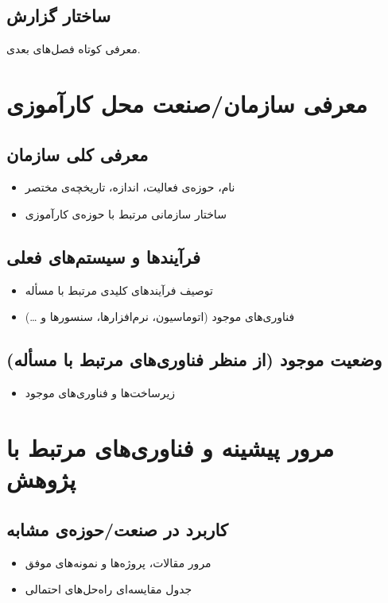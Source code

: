 \documentclass{chamranintern}
\begin{document}
\section{ساختار گزارش}
معرفی کوتاه فصل‌های بعدی.

\chapter{معرفی سازمان/صنعت محل کارآموزی}
\section{معرفی کلی سازمان}
\begin{itemize}
  \item نام، حوزه‌ی فعالیت، اندازه، تاریخچه‌ی مختصر
  \item ساختار سازمانی مرتبط با حوزه‌ی کارآموزی
\end{itemize}

\section{فرآیندها و سیستم‌های فعلی}
\begin{itemize}
  \item توصیف فرآیندهای کلیدی مرتبط با مسأله
  \item فناوری‌های موجود (اتوماسیون، نرم‌افزارها، سنسورها و \ldots)
\end{itemize}

\section{وضعیت موجود (از منظر فناوری‌های مرتبط با مسأله)}
\begin{itemize}
  \item زیرساخت‌ها و فناوری‌های موجود
\end{itemize}

\chapter{مرور پیشینه و فناوری‌های مرتبط با پژوهش}
\section{کاربرد در صنعت/حوزه‌ی مشابه}
\begin{itemize}
  \item مرور مقالات، پروژه‌ها و نمونه‌های موفق \cite{atzori2010iot,gubbi2013iot}
  \item جدول مقایسه‌ای راه‌حل‌های احتمالی
\end{itemize}
\end{document}

